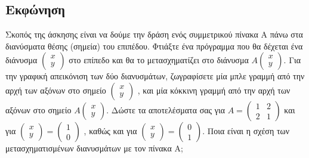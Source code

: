 \documentclass[a4paper,12pt]{article}
\begin{document}
\subsection{Εκφώνηση}
Σκοπός της άσκησης είναι να δούμε την δράση ενός συμμετρικού πίνακα Α πάνω στα
διανύσματα θέσης (σημεία) του επιπέδου. Φτιάξτε ένα πρόγραμμα που θα δέχεται
ένα διάνυσμα $
	\begin{pmatrix}
		x \\
		y
	\end{pmatrix}
$ στο επίπεδο και θα το μετασχηματίζει στο διάνυσμα $
	A
	\begin{pmatrix}
		x \\
		y
	\end{pmatrix}
$. Για την γραφική απεικόνιση των δύο διανυσμάτων, ζωγραφίσετε μία μπλε γραμμή
από την αρχή των αξόνων στο σημείο $
	\begin{pmatrix}
		x \\
		y
	\end{pmatrix}
$ , και μία κόκκινη γραμμή από την αρχή των αξόνων στο σημείο $
	A
	\begin{pmatrix}
		x \\
		y
	\end{pmatrix}
$. Δώστε τα αποτελέσματα σας για $
	A=\begin{pmatrix}
		1 & 2 \\
		2 & 1
	\end{pmatrix}
$ και για $
	\begin{pmatrix}
		x \\
		y
	\end{pmatrix}=\begin{pmatrix}
		1 \\
		0
	\end{pmatrix}
$ , καθώς και για $
	\begin{pmatrix}
		x \\
		y
	\end{pmatrix}=\begin{pmatrix}
		0 \\
		1
	\end{pmatrix}
$. Ποια είναι η σχέση των μετασχηματισμένων διανυσμάτων με τον πίνακα Α;
\end{document}
